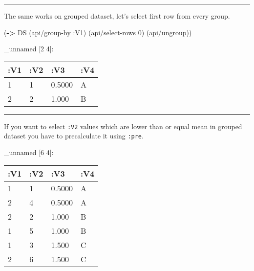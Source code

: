 \documentclass[]{article}
\newenvironment{Shaded}{\begin{snugshade}}{\end{snugshade}}
\newcommand{\KeywordTok}[1]{\textcolor[rgb]{0.13,0.29,0.53}{\textbf{#1}}}
\newcommand{\DecValTok}[1]{\textcolor[rgb]{0.00,0.00,0.81}{#1}}
\newcommand{\VariableTok}[1]{\textcolor[rgb]{0.00,0.00,0.00}{#1}}
\newcommand{\AttributeTok}[1]{\textcolor[rgb]{0.77,0.63,0.00}{#1}}
\newcommand{\NormalTok}[1]{#1}
\begin{document}
\begin{center}\rule{0.5\linewidth}{0.5pt}\end{center}

The same works on grouped dataset, let's select first row from every
group.

\begin{Shaded}
\begin{Highlighting}[]
\NormalTok{(}\KeywordTok{->}\NormalTok{ DS}
\NormalTok{    (api/group-by }\AttributeTok{:V1}\NormalTok{)}
\NormalTok{    (api/select-rows }\DecValTok{0}\NormalTok{)}
\NormalTok{    (api/ungroup))}
\end{Highlighting}
\end{Shaded}

\_unnamed {[}2 4{]}:

\begin{longtable}[]{@{}llll@{}}
\toprule
:V1 & :V2 & :V3 & :V4\tabularnewline
\midrule
\endhead
1 & 1 & 0.5000 & A\tabularnewline
2 & 2 & 1.000 & B\tabularnewline
\bottomrule
\end{longtable}

\begin{center}\rule{0.5\linewidth}{0.5pt}\end{center}

If you want to select \texttt{:V2} values which are lower than or equal
mean in grouped dataset you have to precalculate it using \texttt{:pre}.

\begin{Shaded}
\end{Shaded}

\_unnamed {[}6 4{]}:

\begin{longtable}[]{@{}llll@{}}
\toprule
:V1 & :V2 & :V3 & :V4\tabularnewline
\midrule
\endhead
1 & 1 & 0.5000 & A\tabularnewline
2 & 4 & 0.5000 & A\tabularnewline
2 & 2 & 1.000 & B\tabularnewline
1 & 5 & 1.000 & B\tabularnewline
1 & 3 & 1.500 & C\tabularnewline
2 & 6 & 1.500 & C\tabularnewline
\bottomrule
\end{longtable}
\end{document}
